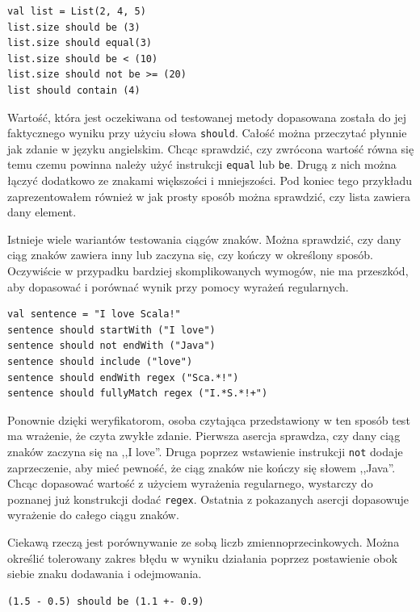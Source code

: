 \documentclass[wimgr]{xmgr}
\begin{document}
\begin{verbatim}
val list = List(2, 4, 5)
list.size should be (3)
list.size should equal(3)
list.size should be < (10)
list.size should not be >= (20)
list should contain (4)
\end{verbatim}

Wartość, która jest oczekiwana od testowanej metody dopasowana została do jej faktycznego wyniku przy użyciu słowa \texttt{should}. Całość można przeczytać płynnie jak zdanie w języku angielskim. 
Chcąc sprawdzić, czy zwrócona wartość równa się temu czemu powinna należy użyć instrukcji \texttt{equal} lub \texttt{be}. Drugą z nich można łączyć dodatkowo ze znakami większości i mniejszości. Pod koniec tego przykładu zaprezentowałem również w jak prosty sposób można sprawdzić, czy lista zawiera dany element.

Istnieje wiele wariantów testowania ciągów znaków. Można sprawdzić, czy dany ciąg znaków zawiera inny lub zaczyna się, czy kończy w określony sposób. Oczywiście w przypadku bardziej skomplikowanych wymogów, nie ma przeszkód, aby dopasować i porównać wynik przy pomocy wyrażeń regularnych.

\begin{verbatim}
val sentence = "I love Scala!"
sentence should startWith ("I love")
sentence should not endWith ("Java")
sentence should include ("love")
sentence should endWith regex ("Sca.*!")
sentence should fullyMatch regex ("I.*S.*!+")
\end{verbatim}

Ponownie dzięki weryfikatorom, osoba czytająca przedstawiony w ten sposób test ma wrażenie, że czyta zwykłe zdanie. Pierwsza asercja sprawdza, czy dany ciąg znaków zaczyna się na ,,I love''. Druga poprzez wstawienie instrukcji \texttt{not} dodaje zaprzeczenie, aby mieć pewność, że ciąg znaków nie kończy się słowem ,,Java''. Chcąc dopasować wartość z użyciem wyrażenia regularnego, wystarczy do poznanej już konstrukcji dodać \texttt{regex}. Ostatnia z pokazanych asercji dopasowuje wyrażenie do całego ciągu znaków.

Ciekawą rzeczą jest porównywanie ze sobą liczb zmiennoprzecinkowych. Można określić tolerowany zakres błędu w wyniku działania poprzez postawienie obok siebie znaku dodawania i odejmowania.

\begin{verbatim}
(1.5 - 0.5) should be (1.1 +- 0.9)
\end{verbatim}
\end{document}
